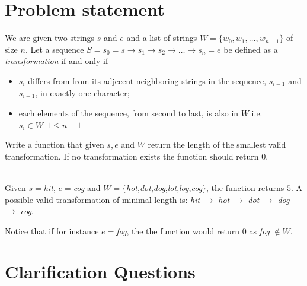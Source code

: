 \section{Problem statement}
\begin{exercise}
\label{example:word_ladder:exercice1}
We are given two strings $s$ and $e$ and a list of strings $W=\{w_0, w_1,\ldots,w_{n-1}\}$ of size $n$.
Let a sequence $S=s_0 = s \rightarrow s_1 \rightarrow s_2 \rightarrow \ldots \rightarrow s_n = e$ be defined as a \textit{transformation} if and only if 
\begin{itemize}
    \item $s_i$ differs from from its adjecent neighboring strings in the sequence, $s_{i-1}$ and $s_{i+1}$, in exactly one character;
    \item each elements of the sequence, from second to last, is also in $W$ i.e. $s_i \in W \: \: 1 \leq n-1 $
\end{itemize}
Write a function that given $s,e$ and $W$ return the length of the smallest valid transformation.
If no transformation exists the function should return $0$.

    \begin{example}
        \label{example:word_ladder:example1}
        \hfill \\
        Given $s=$\textit{hit},  $e=$\textit{cog} and $W=\{$\textit{hot},\textit{dot},\textit{dog},\textit{lot},\textit{log},\textit{cog}$\}$, the function returns $5$.
        A possible valid transformation  of minimal length is: \textit{hit} $\rightarrow$ \textit{hot} $\rightarrow$ \textit{dot} $\rightarrow$ \textit{dog} $\rightarrow$ \textit{cog}.

        Notice that if for instance $e=$\textit{fog}, the the function would return $0$ as \textit{fog} $\notin W$.
    \end{example}

\end{exercise}

\section{Clarification Questions}

